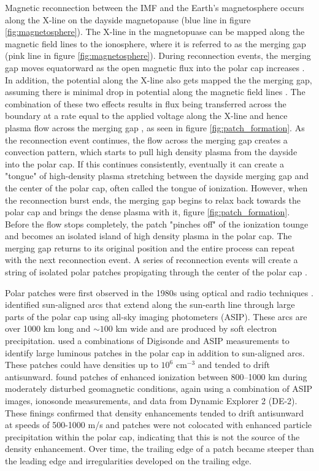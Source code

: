 Magnetic reconnection between the IMF and the Earth's magnetosphere occurs along the X-line on the dayside magnetopause (blue line in figure \ref{fig:magnetosphere}).  The X-line in the magnetopuase can be mapped along the magnetic field lines to the ionosphere, where it is referred to as the merging gap (pink line in figure \ref{fig:magnetosphere}).  During reconnection events, the merging gap moves equatorward as the open magnetic flux into the polar cap increases \citep{Lockwood1992a}.  In addition, the potential along the X-line also gets mapped the the merging gap, assuming there is minimal drop in potential along the magnetic field lines \citep{Lockwood1992b}.  The combination of these two effects results in flux being transferred across the boundary at a rate equal to the applied voltage  along the X-line and hence plasma flow across the merging gap \citep{Lockwood1992b}, as seen in figure \ref{fig:patch_formation}.  As the reconnection event continues, the flow across the merging gap creates a convection pattern, which starts to pull high density plasma from the dayside into the polar cap.  If this continues consistently, eventually it can create a "tongue" of high-density plasma stretching between the dayside merging gap and the center of the polar cap, often called the tongue of ionization.  However, when the reconnection burst ends, the merging gap begins to relax back towards the polar cap and brings the dense plasma with it, figure \ref{fig:patch_formation}.  Before the flow stops completely, the patch "pinches off" of the ionization tounge and becomes an isolated island of high density plasma in the polar cap.  The merging gap returns to its original position and the entire process can repeat with the next reconnection event.  A series of reconnection events will create a string of isolated polar patches propigating through the center of the polar cap \citep{Lockwook1992b}.





Polar patches were first observed in the 1980s using optical and radio techniques \citep{Weber1981,Buchau1983,Weber1984}.  \citet{Weber1981} identified sun-aligned arcs that extend  along the sun-earth line through large parts of the polar cap using all-sky imaging photometers (ASIP).  These arcs are over 1000 km long and \(\sim100\) km wide and are produced by soft electron precipitation.  \citet{Buchau1983} used a combinations of Digisonde and ASIP measurements to identify large luminous patches in the polar cap in addition to sun-aligned arcs.  These patches could have densities up to \(10^6\) cm\(^{-3}\) and tended to drift antisunward.  \citet{Weber1984} found patches of enhanced ionization between 800--1000 km during moderately disturbed geomagnetic conditions, again using a combination of ASIP images, ionosonde measurements, and data from Dynamic Explorer 2 (DE-2).  These finings confirmed that density enhancements tended to drift antisunward at speeds of 500-1000 m/s and patches were not colocated with enhanced particle precipitation within the polar cap, indicating that this is not the source of the density enhancement.  Over time, the trailing edge of a patch became steeper than the leading edge and irregularities developed on the trailing edge.

